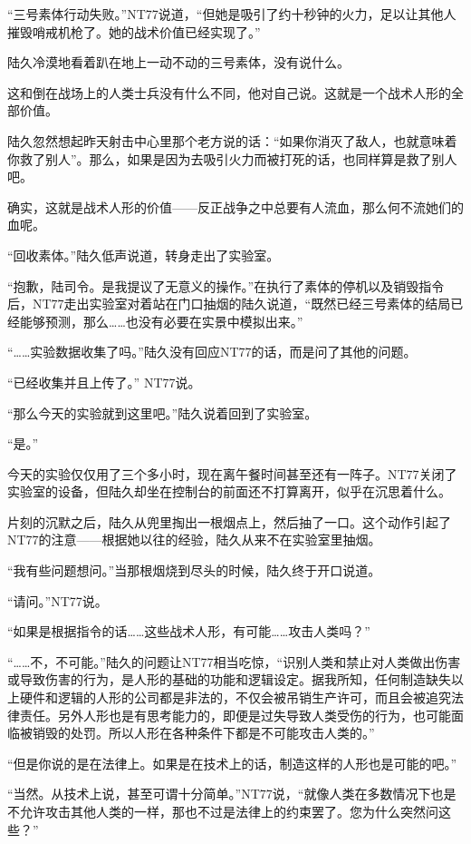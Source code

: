 “三号素体行动失败。”NT77说道，“但她是吸引了约十秒钟的火力，足以让其他人摧毁哨戒机枪了。她的战术价值已经实现了。”

陆久冷漠地看着趴在地上一动不动的三号素体，没有说什么。

这和倒在战场上的人类士兵没有什么不同，他对自己说。这就是一个战术人形的全部价值。

陆久忽然想起昨天射击中心里那个老方说的话：“如果你消灭了敌人，也就意味着你救了别人”。那么，如果是因为去吸引火力而被打死的话，也同样算是救了别人吧。

确实，这就是战术人形的价值——反正战争之中总要有人流血，那么何不流她们的血呢。

“回收素体。”陆久低声说道，转身走出了实验室。

“抱歉，陆司令。是我提议了无意义的操作。”在执行了素体的停机以及销毁指令后，NT77走出实验室对着站在门口抽烟的陆久说道，“既然已经三号素体的结局已经能够预测，那么……也没有必要在实景中模拟出来。”

“……实验数据收集了吗。”陆久没有回应NT77的话，而是问了其他的问题。

“已经收集并且上传了。” NT77说。

“那么今天的实验就到这里吧。”陆久说着回到了实验室。

“是。”

今天的实验仅仅用了三个多小时，现在离午餐时间甚至还有一阵子。NT77关闭了实验室的设备，但陆久却坐在控制台的前面还不打算离开，似乎在沉思着什么。

片刻的沉默之后，陆久从兜里掏出一根烟点上，然后抽了一口。这个动作引起了NT77的注意——根据她以往的经验，陆久从来不在实验室里抽烟。

“我有些问题想问。”当那根烟烧到尽头的时候，陆久终于开口说道。

“请问。”NT77说。

“如果是根据指令的话……这些战术人形，有可能……攻击人类吗？”

“……不，不可能。”陆久的问题让NT77相当吃惊，“识别人类和禁止对人类做出伤害或导致伤害的行为，是人形的基础的功能和逻辑设定。据我所知，任何制造缺失以上硬件和逻辑的人形的公司都是非法的，不仅会被吊销生产许可，而且会被追究法律责任。另外人形也是有思考能力的，即便是过失导致人类受伤的行为，也可能面临被销毁的处罚。所以人形在各种条件下都是不可能攻击人类的。”

“但是你说的是在法律上。如果是在技术上的话，制造这样的人形也是可能的吧。”

“当然。从技术上说，甚至可谓十分简单。”NT77说，“就像人类在多数情况下也是不允许攻击其他人类的一样，那也不过是法律上的约束罢了。您为什么突然问这些？”

